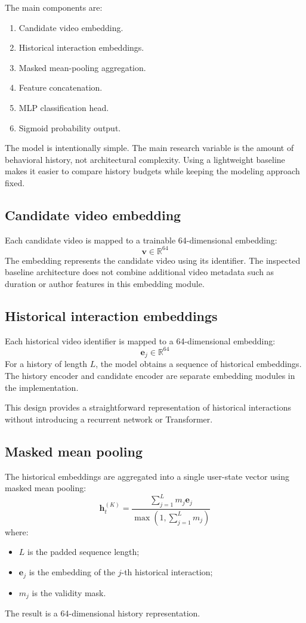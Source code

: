 \documentclass[11pt,a4paper]{article}
\begin{document}
The main components are:
\begin{enumerate}
    \item Candidate video embedding.
    \item Historical interaction embeddings.
    \item Masked mean-pooling aggregation.
    \item Feature concatenation.
    \item MLP classification head.
    \item Sigmoid probability output.
\end{enumerate}
The model is intentionally simple. The main research variable is the amount of behavioral history, not architectural complexity. Using a lightweight baseline makes it easier to compare history budgets while keeping the modeling approach fixed.

\subsection{Candidate video embedding}
Each candidate video is mapped to a trainable 64-dimensional embedding:
\begin{equation}
\mathbf{v} \in \mathbb{R}^{64}
\end{equation}
The embedding represents the candidate video using its identifier. The inspected baseline architecture does not combine additional video metadata such as duration or author features in this embedding module.

\subsection{Historical interaction embeddings}
Each historical video identifier is mapped to a 64-dimensional embedding:
\begin{equation}
\mathbf{e}_j \in \mathbb{R}^{64}
\end{equation}
For a history of length $L$, the model obtains a sequence of historical embeddings. The history encoder and candidate encoder are separate embedding modules in the implementation.

This design provides a straightforward representation of historical interactions without introducing a recurrent network or Transformer.

\subsection{Masked mean pooling}
The historical embeddings are aggregated into a single user-state vector using masked mean pooling:
\begin{equation}
\mathbf{h}_t^{(K)} = \frac{\sum_{j=1}^{L} m_j \mathbf{e}_j}{\max\left(1, \sum_{j=1}^{L} m_j\right)}
\end{equation}
where:
\begin{itemize}
    \item $L$ is the padded sequence length;
    \item $\mathbf{e}_j$ is the embedding of the $j$-th historical interaction;
    \item $m_j$ is the validity mask.
\end{itemize}
The result is a 64-dimensional history representation.
\end{document}
